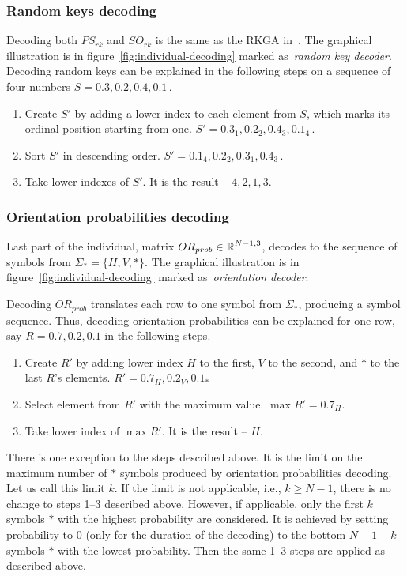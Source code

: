 \subsubsection*{Random keys decoding}
Decoding both $PS_{rk}$ and $SO_{rk}$ is the same as the RKGA in~\cite{beanGeneticAlgorithmsRandom1994}.
The graphical illustration is in figure~\ref{fig:individual-decoding} marked as~\textit{random key decoder}.
Decoding random keys can be explained in the following steps on a sequence of four numbers $S = 0.3, 0.2, 0.4, 0.1$\,.

\begin{enumerate}
    \item Create $S'$ by adding a lower index to each element from $S$, which marks its ordinal position starting from one.
    $S' = 0.3_1, 0.2_2, 0.4_3, 0.1_4$\,.
    \item Sort $S'$ in descending order. $S' = 0.1_4, 0.2_2,  0.3_1, 0.4_3$\,.
    \item Take lower indexes of $S'$.
    It is the result – $4, 2, 1, 3$.
\end{enumerate}

\subsubsection*{Orientation probabilities decoding}

Last part of the individual, matrix $OR_{prob} \in \operatorname*{\mathbb{R}}^{N-1, 3}$, decodes to the sequence of symbols from $\Sigma_* = \{H, V, *\} $.
The graphical illustration is in figure~\ref{fig:individual-decoding} marked as~\textit{orientation decoder}.

Decoding $OR_{prob}$ translates each row to one symbol from $\Sigma_*$, producing a symbol sequence.
Thus, decoding orientation probabilities can be explained for one row, say $R = 0.7, 0.2, 0.1$
in the following steps.


\begin{enumerate}
    \item Create $R'$ by adding lower index $H$ to the first, $V$ to the second, and $*$ to the last $R$'s elements.
    $R' = 0.7_H, 0.2_V, 0.1_*$
    \item Select element from $R'$ with the maximum value. $\max R' = 0.7_H$.
    \item Take lower index of $\max R'$.
    It is the result – $H$.
\end{enumerate}

There is one exception to the steps described above.
It is the limit on the maximum number of $*$ symbols produced by orientation probabilities decoding.
Let us call this limit $k$.
If the limit is not applicable, i.e., $k \geq N-1$, there is no change to steps 1--3 described above.
However, if applicable, only the first $k$ symbols $*$ with the highest probability are considered.
It is achieved by setting probability to $0$ (only for the duration of the decoding) to the bottom $N-1-k$ symbols $*$ with the lowest probability.
Then the same 1--3 steps are applied as described above.

